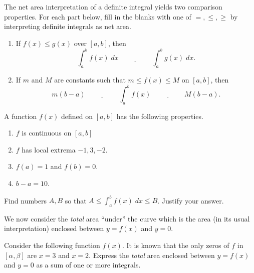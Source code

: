 \documentclass[../main.tex]{subfiles}
\begin{document}
\clearpage

The net area interpretation of a definite integral yields two comparison properties. For each part below, fill in the blanks with one of \(=, \le , \ge\) by interpreting definite integrals as net area.
\begin{enumerate}
  \item If \(f(x) \le g(x)\) over \([a,b]\), then
    \[
      \int_{a}^{b} f(x) \;dx \underline{\hspace{2cm}} \int_{a}^{b} g(x) \;dx.
    \]

  \item If \(m\) and \(M\) are constants such that \(m \le f(x) \le M\) on \([a,b]\), then
    \[
      m(b-a) \underline{\hspace{2cm}} \int_{a}^{b} f(x) \underline{\hspace{2cm}} M(b-a).
    \]
\end{enumerate}

\begin{example}
  A function \(f(x)\) defined on \([a,b]\) has the following properties. 
  \begin{enumerate}
    \item \(f\) is continuous on \([a,b]\)
    \item \(f\) has local extrema \(-1, 3, -2\). 
    \item \(f(a) = 1\) and \(f(b) = 0\).
    \item \(b - a = 10\).
  \end{enumerate}

  Find numbers \(A,B\) so that \(A \le \int_{a}^{b} f(x) \;dx \le B\). Justify your answer. 

\end{example}
\clearpage

We now consider the \emph{total} area ``under'' the curve which is the area (in its usual interpretation) enclosed between \(y = f(x)\) and \(y = 0\).


\begin{example}
  Consider the following function \(f(x)\).  It is known that the only zeros of \(f\) in \([\alpha, \beta]\) are \(x = 3\) and \(x = 2\). Express the \emph{total} area enclosed between \(y = f(x)\) and \(y = 0\) as a sum of one or more integrals.

  

\end{example}
\clearpage
\end{document}

